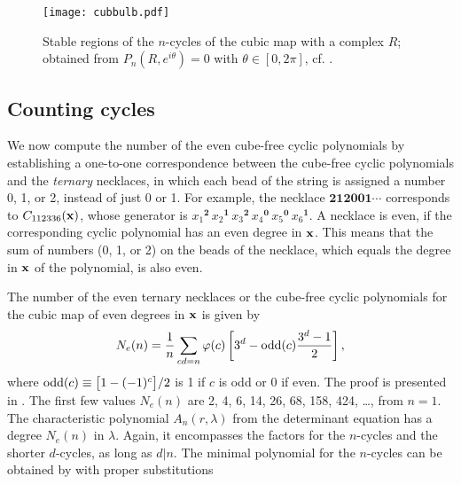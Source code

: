\documentclass[twocolumn]{revtex4-1}
\begin{document}
\begin{figure}[h]
  \begin{minipage}{\linewidth}
    \begin{center}
        \texttt{[image: cubbulb.pdf]}
    \end{center}
  \end{minipage}%
  \caption{
  \label{fig:cubbulb}
  Stable regions of the $n$-cycles of the cubic map 
  with a complex $R$;
  obtained from $P_n(R, e^{i\theta}) = 0$ with $\theta \in [0, 2\pi]$,
  cf. .
}
\end{figure}


\subsection{Counting cycles}

We now compute the number of the even cube-free cyclic polynomials
by establishing a one-to-one correspondence between
the cube-free cyclic polynomials and the \emph{ternary} necklaces,
in which each bead of the string is assigned a number
0, 1, or 2, instead of just 0 or 1.
%
For example, the necklace $\mathbf{212001\cdots}$
corresponds to $C_{112336}(\mathbf{x})$,
whose generator is
${x_1}^\mathbf{2} \,
 {x_2}^\mathbf{1} \,
 {x_3}^\mathbf{2} \,
 {x_4}^\mathbf{0} \,
 {x_5}^\mathbf{0} \,
 {x_6}^\mathbf{1}$.
%
A necklace is even,
if the corresponding cyclic polynomial has an even degree in $\mathbf{x}$.
%
This means that the sum of numbers (0, 1, or 2)
  on the beads of the necklace,
  which equals the degree in $\mathbf{x}$ of the polynomial, is also even.

%


The number of the even ternary necklaces
or the cube-free cyclic polynomials for the cubic map of even degrees in $\mathbf{x}$
is given by
\begin{equation}
  N_e(n) = \frac{1}{n} \sum_{c d = n} \varphi(c)
    \left[
      3^d - \mathrm{odd}(c) \frac{3^d-1}{2}
    \right],
\label{eq:cubnecklace}
\end{equation}
where
$\mathrm{odd}(c) \equiv \big[1 - (-1)^c\big]/2$ is 1 if $c$ is odd or 0 if even.
%
The proof is presented in .
The first few values $N_e(n)$ are
  2, 4, 6, 14, 26, 68, 158, 424, \dots, from $n = 1$.
%
%
The characteristic polynomial $A_n(r, \lambda)$
  from the determinant equation
  has a degree $N_e(n)$ in $\lambda$.
Again, it encompasses the factors for the $n$-cycles
  and the shorter $d$-cycles, as long as $d|n$.
The minimal polynomial for the $n$-cycles can be obtained
  by  with proper substitutions
\end{document}
